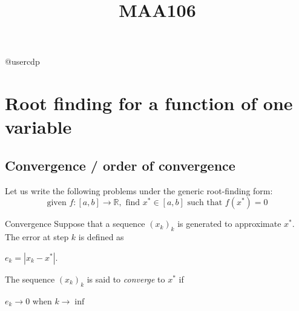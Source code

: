 \documentclass{article}
\title{MAA106}
\begin{document}
\begin{flushright}@usercdp\end{flushright}

\section{Root finding for a function of one variable}

    \subsection{Convergence / order of convergence}

        Let us write the following problems under the generic root-finding form:
        \begin{equation}
            \text{given } f: [a,b] \rightarrow \mathbb{R}, \text{ find } x^* \in [a,b] \text{ such that } f(x^*)=0 \nonumber
        \end{equation}


        \begin{definition}{Convergence}
            Suppose that a sequence $(x_k)_k$ is generated to approximate $x^*$. The error at step $k$ is defined as
            
            \centerline{$e_k = |x_k - x^*|. $}
            

            The sequence $(x_k)_k$ is said to \textit{converge} to $x^*$ if

            \centerline{$e_k \longrightarrow 0$ when $k \rightarrow \inf$}
        \end{definition}

        \vspace{10pt}
\end{document}
